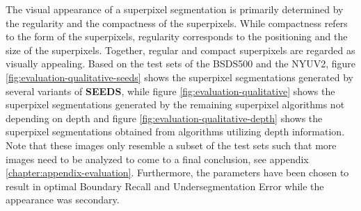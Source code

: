 The visual appearance of a superpixel segmentation is primarily determined by the regularity and the compactness of the superpixels. While compactness refers to the form of the superpixels, regularity corresponds to the positioning and the size of the superpixels. Together, regular and compact superpixels are regarded as visually appealing. Based on the test sets of the BSDS500 and the NYUV2, figure \ref{fig:evaluation-qualitative-seeds} shows the superpixel segmentations generated by several variants of \textbf{SEEDS}, while figure \ref{fig:evaluation-qualitative} shows the superpixel segmentations generated by the remaining superpixel algorithms not depending on depth and figure \ref{fig:evaluation-qualitative-depth} shows the superpixel segmentations obtained from algorithms utilizing depth information. Note that these images only resemble a subset of the test sets such that more images need to be analyzed to come to a final conclusion, see appendix \ref{chapter:appendix-evaluation}. Furthermore, the parameters have been chosen to result in optimal Boundary Recall and Undersegmentation Error while the appearance was secondary.
